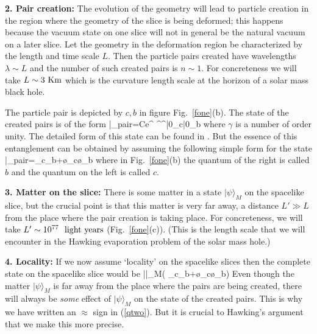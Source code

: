 \documentclass[12pt]{article}
\begin{document}
{\bf 2. Pair creation:} The evolution of the geometry will lead to particle creation in the region where the geometry of the slice is being deformed; this happens because  the vacuum state on one slice will not in general be the natural vacuum on a later slice.  Let the geometry in the deformation region 
 be characterized by the length and time scale $L$. Then the particle pairs created have wavelengths $\lambda\sim L$
and the number of such created pairs is $n\sim 1$. For concreteness we will take 
$L\sim 3 ~{\rm Km}$
which is the curvature length scale at the horizon of a solar mass black hole.

The particle pair is depicted by $c, b$ in figure Fig.~\ref{fone}(b).
The state of the created pairs is of the form
 \be
 |\Psi\rangle_{\rm pair}=Ce^{ ^^\dagger}|0\rangle_c|0\rangle_b
 \label{actualstate}
 \ee
 where $\gamma$ is a number of order unity. The detailed form of this state can be found in \cite{hawking,giddings}. But the essence of this entanglement can be obtained by assuming the following simple form for the state
\be
|\Psi\rangle_{\rm pair}=\sq \z_c\z_b+\sq\o_c\o_b
\label{pairs}
\ee
where in Fig.~\ref{fone}(b)  the quantum of the right is called $b$ and the quantum on the left is called $c$. 


\b

{\bf 3. Matter on the slice:} There is some matter in a state $|\psi\rangle_M$ on the spacelike slice, but the crucial point is that this matter is very far away, a distance
$L'\gg L$
from the place where the pair creation is taking place. For concreteness, we will take
$L'\sim 10^{77} ~~{\rm light~years}$ (Fig.~\ref{fone}(c)).
(This is the length scale that we will encounter in the Hawking evaporation problem of the solar mass hole.)


\b

{\bf 4. Locality:} If we now assume  `locality' on the spacelike slices then the complete state on the spacelike slice would be
\be
|\Psi\rangle\approx |\psi\rangle_M\otimes\Big( \sq \z_c\z_b+\sq\o_c\o_b\Big)
\label{qtwo}
\ee
Even though the matter $|\psi\rangle_M$ is far away from the place where the pairs are being created, there will always be {\it some} effect of $|\psi\rangle_M$ on the state of the created pairs. This is why we have written an $\approx$ sign in (\ref{qtwo}). But it is crucial to Hawking's argument that we make this more precise.
\end{document}
